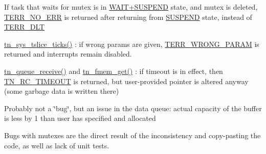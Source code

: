 \begin{DoxyItemize}
\item If task that waits for mutex is in \hyperlink{tn__tasks_8h_a5e12e8a0ab280b515f44bf3fee1210a6ad010070ccc16a5c706c286baf2e3ee2a}{{\ttfamily W\+A\+I\+T+\+S\+U\+S\+P\+E\+N\+D}} state, and mutex is deleted, {\ttfamily \hyperlink{tn__oldsymbols_8h_a71970f860643e62fad7ec03076bdc1d8}{T\+E\+R\+R\+\_\+\+N\+O\+\_\+\+E\+R\+R}} is returned after returning from \hyperlink{tn__tasks_8h_a5e12e8a0ab280b515f44bf3fee1210a6adcf21b28920038f38cccc50fda12ba58}{{\ttfamily S\+U\+S\+P\+E\+N\+D}} state, instead of {\ttfamily \hyperlink{tn__oldsymbols_8h_ae6a83c118d209d8702c3fc40d58ea18f}{T\+E\+R\+R\+\_\+\+D\+L\+T}}
\item {\ttfamily \hyperlink{tn__oldsymbols_8h_a74b0cfd9bbf5a85f4e0d00a984f60f5e}{tn\+\_\+sys\+\_\+tslice\+\_\+ticks()}} \+: if wrong params are given, {\ttfamily \hyperlink{tn__oldsymbols_8h_a35ec519d54f884d84c5814f49f00a22b}{T\+E\+R\+R\+\_\+\+W\+R\+O\+N\+G\+\_\+\+P\+A\+R\+A\+M}} is returned and interrupts remain disabled.
\item {\ttfamily \hyperlink{tn__dqueue_8h_a589bfb4d3966bc7405dcf959d7114544}{tn\+\_\+queue\+\_\+receive()}} and {\ttfamily \hyperlink{tn__fmem_8h_afb45a1f427b531b22f1f4b013f415ae0}{tn\+\_\+fmem\+\_\+get()}} \+: if {\ttfamily timeout} is in effect, then {\ttfamily \hyperlink{tn__common_8h_aa43bd3da1ad4c1e61224b5f23b369876a5b4d73fde6b5d1c9579c02e6aafce1fb}{T\+N\+\_\+\+R\+C\+\_\+\+T\+I\+M\+E\+O\+U\+T}} is returned, but user-\/provided pointer is altered anyway (some garbage data is written there)
\item Probably not a \char`\"{}bug\char`\"{}, but an issue in the data queue\+: actual capacity of the buffer is less by 1 than user has specified and allocated
\end{DoxyItemize}

Bugs with mutexes are the direct result of the inconsistency and copy-\/pasting the code, as well as lack of unit tests. 
